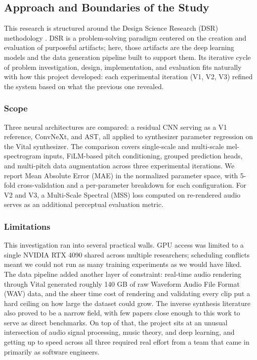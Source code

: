 \subsection{Approach and Boundaries of the Study}

This research is structured around the Design Science Research (DSR) methodology \cite{wieringa2014design}. DSR is a problem-solving paradigm centered on the creation and evaluation of purposeful artifacts; here, those artifacts are the deep learning models and the data generation pipeline built to support them. Its iterative cycle of problem investigation, design, implementation, and evaluation fits naturally with how this project developed: each experimental iteration (V1, V2, V3) refined the system based on what the previous one revealed.

\subsubsection{Scope}
Three neural architectures are compared: a residual CNN serving as a V1 reference, ConvNeXt, and AST, all applied to synthesizer parameter regression on the Vital synthesizer. The comparison covers single-scale and multi-scale mel-spectrogram inputs, FiLM-based pitch conditioning, grouped prediction heads, and multi-pitch data augmentation across three experimental iterations. We report Mean Absolute Error (MAE) in the normalized parameter space, with 5-fold cross-validation and a per-parameter breakdown for each configuration. For V2 and V3, a Multi-Scale Spectral (MSS) loss computed on re-rendered audio serves as an additional perceptual evaluation metric.

\subsubsection{Limitations}
This investigation ran into several practical walls. GPU access was limited to a single NVIDIA RTX 4090 shared across multiple researchers; scheduling conflicts meant we could not run as many training experiments as we would have liked. The data pipeline added another layer of constraint: real-time audio rendering through Vital generated roughly 140 GB of raw Waveform Audio File Format (WAV) data, and the sheer time cost of rendering and validating every clip put a hard ceiling on how large the dataset could grow. The inverse synthesis literature also proved to be a narrow field, with few papers close enough to this work to serve as direct benchmarks. On top of that, the project sits at an unusual intersection of audio signal processing, music theory, and deep learning, and getting up to speed across all three required real effort from a team that came in primarily as software engineers.

